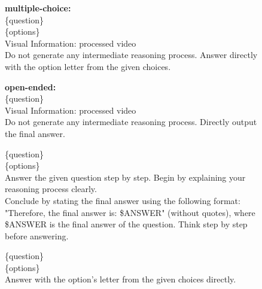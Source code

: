 \begin{figure}[h]
\begin{tcolorbox}[colback=black!7.5!white, colframe=black!80!white, title=MMVU -- For other models, fontupper=\footnotesize, fontlower=\footnotesize, fonttitle=\footnotesize]

\textbf{multiple-choice:}\\
\{question\}\\
\{options\}\\
Visual Information: processed video\\
Do not generate any intermediate reasoning process. Answer directly with the option letter from the given choices.

\tcblower
\textbf{open-ended:}\\
\{question\}\\
Visual Information: processed video\\
Do not generate any intermediate reasoning process. Directly output the final answer.

\end{tcolorbox}
\end{figure}


\begin{figure}[h]
\begin{tcolorbox}[colback=black!7.5!white, colframe=black!80!white, title={SciVideoBench -- For Qwen series thinking models, GPT-5.4, Gemini 3 Pro, Claude Opus 4.5 and InternVL3.5-8B}, fontupper=\footnotesize, fontlower=\footnotesize, fonttitle=\footnotesize]
\{question\}\\
\{options\}\\
Answer the given question step by step. Begin by explaining your reasoning process
clearly.\\
Conclude by stating the final answer using the following format: "Therefore, the final answer is: \$ANSWER" (without quotes), where \$ANSWER is the final answer of the question. Think step by step before answering.
\end{tcolorbox}
\end{figure}

\begin{figure}[h]
\begin{tcolorbox}[colback=black!7.5!white, colframe=black!80!white, title={SciVideoBench -- For Qwen series instruct models and other models}, fontupper=\footnotesize, fontlower=\footnotesize, fonttitle=\footnotesize]
\{question\}\\
\{options\}\\
Answer with the option's letter from the given choices directly.
\end{tcolorbox}
\end{figure}



